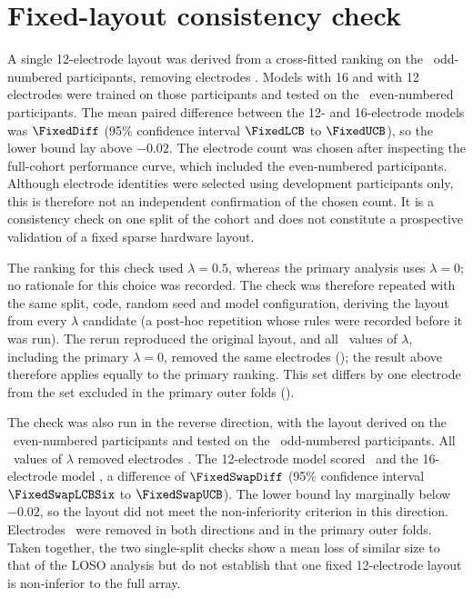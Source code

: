 \documentclass{iopjournal}
\newif\ifshowchanges
\newcommand{\chg}[1]{\ifshowchanges{\color{blue}#1}\else{#1}\fi}
\begin{document}
\section{Fixed-layout consistency check}
\label{app:fixed}
A single 12-electrode layout was derived from a cross-fitted ranking on the \FixedDev\ odd-numbered participants, removing electrodes \FixedDropped. Models with 16 and with 12 electrodes were trained on those participants and tested on the \FixedTest\ even-numbered participants. \chg{The mean paired difference between the 12- and 16-electrode models was $\FixedDiff$ (95\% confidence interval $\FixedLCB$ to $\FixedUCB$), so the lower bound lay above $-0.02$.} The electrode count was chosen after inspecting the full-cohort performance curve, which included the even-numbered participants. Although electrode identities were selected using development participants only, this is therefore not an independent confirmation of the chosen count. \chg{It is a consistency check on one split of the cohort} and does not constitute a prospective validation of a fixed sparse hardware layout.

The ranking for this check used $\lambda = 0.5$, whereas the primary analysis uses $\lambda = 0$; no rationale for this choice was recorded. \chg{The check was therefore repeated with the same split, code, random seed and model configuration, deriving the layout from every $\lambda$ candidate (a post-hoc repetition whose rules were recorded before it was run). The rerun reproduced the original layout, and all \FixedNLambdaSameOrig\ values of $\lambda$, including the primary $\lambda = 0$, removed the same electrodes (\FixedDropped); the result above therefore applies equally to the primary ranking. This set differs by one electrode from the set excluded in the primary outer folds (\DroppedFourSet).}

\chg{The check was also run in the reverse direction, with the layout derived on the \FixedSwapDev\ even-numbered participants and tested on the \FixedSwapTest\ odd-numbered participants. All \FixedSwapNLambdaSame\ values of $\lambda$ removed electrodes \FixedSwapDropped. The 12-electrode model scored \FixedSwapTwelve\ and the 16-electrode model \FixedSwapFull, a difference of $\FixedSwapDiff$ (95\% confidence interval $\FixedSwapLCBSix$ to $\FixedSwapUCB$). The lower bound lay marginally below $-0.02$, so the layout did not meet the non-inferiority criterion in this direction. Electrodes \FixedDroppedBoth\ were removed in both directions and in the primary outer folds. Taken together, the two single-split checks show a mean loss of similar size to that of the LOSO analysis but do not establish that one fixed 12-electrode layout is non-inferior to the full array.}
\end{document}
